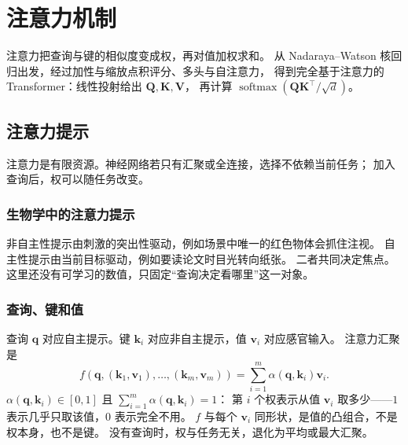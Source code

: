 \chapter{注意力机制}

注意力把查询与键的相似度变成权，再对值加权求和。
从 Nadaraya--Watson 核回归出发，经过加性与缩放点积评分、多头与自注意力，
得到完全基于注意力的 Transformer：线性投射给出 $\bm{Q},\bm{K},\bm{V}$，
再计算 $\operatorname{softmax}(\bm{Q}\bm{K}^{\top}/\sqrt{d})$。

\section{注意力提示}





注意力是有限资源。神经网络若只有汇聚或全连接，选择不依赖当前任务；
加入查询后，权可以随任务改变。

\subsection{生物学中的注意力提示}

非自主性提示由刺激的突出性驱动，例如场景中唯一的红色物体会抓住注视。
自主性提示由当前目标驱动，例如要读论文时目光转向纸张。
二者共同决定焦点。这里还没有可学习的数值，只固定“查询决定看哪里”这一对象。

\subsection{查询、键和值}

查询 $\bm{q}$ 对应自主提示。键 $\bm{k}_i$ 对应非自主提示，值 $\bm{v}_i$ 对应感官输入。
注意力汇聚是
\[
f(\bm{q},(\bm{k}_1,\bm{v}_1),\ldots,(\bm{k}_m,\bm{v}_m))
=
\sum_{i=1}^{m}\alpha(\bm{q},\bm{k}_i)\bm{v}_i.
\]
$\alpha(\bm{q},\bm{k}_i)\in[0,1]$ 且 $\sum_{i=1}^{m}\alpha(\bm{q},\bm{k}_i)=1$：
第 $i$ 个权表示从值 $\bm{v}_i$ 取多少——$1$ 表示几乎只取该值，$0$ 表示完全不用。
$f$ 与每个 $\bm{v}_i$ 同形状，是值的凸组合，不是权本身，也不是键。
没有查询时，权与任务无关，退化为平均或最大汇聚。

